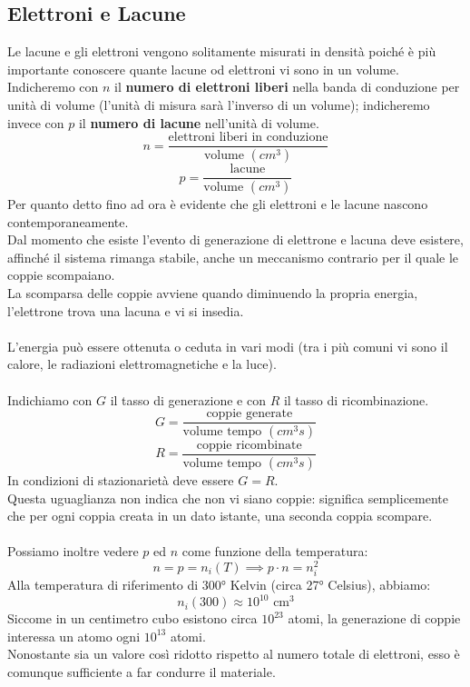 \documentclass[../main.tex]{subfiles}
\begin{document}
	\subsection{Elettroni e Lacune}
	Le lacune e gli elettroni vengono solitamente misurati in densità poiché è più importante conoscere quante lacune od elettroni vi sono in un volume. \\
	Indicheremo con $n$ il \textbf{numero di elettroni liberi }nella banda di conduzione per unità di volume (l’unità di misura sarà l’inverso di un volume); indicheremo invece con $p$ il \textbf{numero di lacune} nell’unità di volume.
	$$n = \frac{\text{elettroni liberi in conduzione}}{\text{volume } (cm^3)}$$
	$$p = \frac{\text{lacune}}{\text{volume } (cm^3)}$$
	Per quanto detto fino ad ora è evidente che gli elettroni e le lacune nascono contemporaneamente. \\
	Dal momento che esiste l’evento di generazione di elettrone e lacuna deve esistere, affinché il sistema rimanga stabile, anche un meccanismo contrario per il quale le coppie scompaiano. \\
	La scomparsa delle coppie avviene quando diminuendo la propria energia, l’elettrone trova una lacuna e vi si insedia.\\\\
	L’energia può essere ottenuta o ceduta in vari modi (tra i più comuni vi sono il calore, le radiazioni elettromagnetiche e la luce).\\\\
	Indichiamo con $G$ il tasso di generazione e con $R$ il tasso di ricombinazione.
	$$G = \frac{\text{coppie generate}}{\text{volume tempo } (cm^3 s)}$$
	$$R = \frac{\text{coppie ricombinate}}{\text{volume tempo } (cm^3 s)}$$
	In condizioni di stazionarietà deve essere $G = R$. \\
	Questa uguaglianza non indica che non vi siano coppie: significa semplicemente che per ogni coppia creata in un dato istante, una seconda coppia scompare.\\\\
	Possiamo inoltre vedere $p$ ed $n$ come funzione della temperatura:
	$$n = p = n_i(T) \implies p \cdot n = n_i^2$$
	Alla temperatura di riferimento di 300° Kelvin (circa 27° Celsius), abbiamo:
	$$n_i(300) \approx 10^{10} \text{ cm}^3$$
	Siccome in un centimetro cubo esistono circa $10^{23}$ atomi, la generazione di coppie interessa un atomo ogni $10^{13}$ atomi. \\
	Nonostante sia un valore così ridotto rispetto al numero totale di elettroni, esso è comunque sufficiente a far condurre il materiale.
\end{document}
